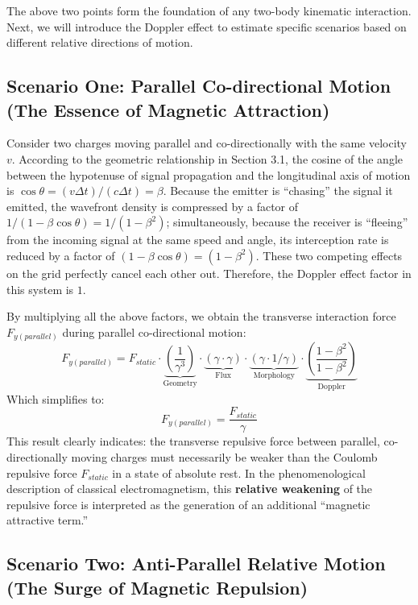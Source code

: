 \documentclass[12pt, a4paper]{article}
\begin{document}
The above two points form the foundation of any two-body kinematic interaction. Next, we will introduce the Doppler effect to estimate specific scenarios based on different relative directions of motion.

\subsection{Scenario One: Parallel Co-directional Motion (The Essence of Magnetic Attraction)}

Consider two charges moving parallel and co-directionally with the same velocity $v$. According to the geometric relationship in Section 3.1, the cosine of the angle between the hypotenuse of signal propagation and the longitudinal axis of motion is $\cos\theta = (v\Delta t)/(c\Delta t) = \beta$. Because the emitter is ``chasing'' the signal it emitted, the wavefront density is compressed by a factor of $1/(1-\beta\cos\theta) = 1/(1-\beta^2)$; simultaneously, because the receiver is ``fleeing'' from the incoming signal at the same speed and angle, its interception rate is reduced by a factor of $(1-\beta\cos\theta) = (1-\beta^2)$. These two competing effects on the grid perfectly cancel each other out. Therefore, the Doppler effect factor in this system is $1$.

By multiplying all the above factors, we obtain the transverse interaction force $F_{y(parallel)}$ during parallel co-directional motion:
\[
F_{y(parallel)} = F_{static} \cdot \underbrace{\left(\frac{1}{\gamma^3}\right)}_{\text{Geometry}} \cdot \underbrace{(\gamma \cdot \gamma)}_{\text{Flux}} \cdot \underbrace{(\gamma \cdot 1/\gamma)}_{\text{Morphology}} \cdot \underbrace{(\frac{1-\beta^2}{1-\beta^2} )}_{\text{Doppler}}
\]
Which simplifies to:
\[
F_{y(parallel)} = \frac{F_{static}}{\gamma}
\]
This result clearly indicates: the transverse repulsive force between parallel, co-directionally moving charges must necessarily be weaker than the Coulomb repulsive force $F_{static}$ in a state of absolute rest. In the phenomenological description of classical electromagnetism, this \textbf{relative weakening} of the repulsive force is interpreted as the generation of an additional ``magnetic attractive term.''

\subsection{Scenario Two: Anti-Parallel Relative Motion (The Surge of Magnetic Repulsion)}
\end{document}
